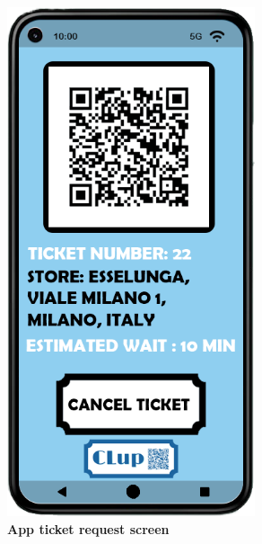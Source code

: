\begin{itemize}
\begin{figure}[!htb]
\begin{minipage}{0.4\textwidth}
\includegraphics[width=0.65\textwidth]{Images/App/Android_RequestTicket}
\captionsetup{justification=centering}
\caption{\label{fig:androidticket}\textbf{App ticket request screen}}
\end{minipage}
\end{figure}
\end{itemize}
\newpage

